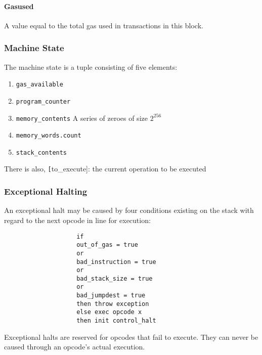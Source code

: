 \documentclass[10pt,a4paper,leqno,bibliography=totoc]{scrartcl}
\newenvironment{alphafootnotes}
{\par\edef\savedfootnotenumber{\number\value{footnote}}
\renewcommand{\thefootnote}{\alph{footnote}}
\setcounter{footnote}{0}}
{\par\setcounter{footnote}{\savedfootnotenumber}}
\begin{document}
\begin{alphafootnotes}
\begin{multicols*}{2}
				
				\paragraph{Gasused}
				A value equal to the total gas used in transactions in this block. 

				\subsubsection{Machine State}
				The machine state is a tuple consisting of five elements:
		
		\begin{enumerate}
			\item \texttt{gas\_available}
			\item \texttt{program\_counter}
			\item \texttt{memory\_contents} A series of zeroes of size $2^{256}$
			\item \texttt{memory\_words.count}
			\item \texttt{stack\_contents}
		\end{enumerate}

		There is also, \texttt[to\_execute]: the current operation to be executed
		
				\subsubsection{Exceptional Halting}
				An exceptional halt may be caused by four conditions existing on the stack with regard to the next opcode in line for execution:
		
					\begin{verbatim}
					if 
					out_of_gas = true 
					or
					bad_instruction = true
					or
					bad_stack_size = true
					or
					bad_jumpdest = true
					then throw exception
					else exec opcode x
					then init control_halt
					\end{verbatim}	
		
		Exceptional halts are reserved for opcodes that fail to execute. They can never be caused through an opcode's actual execution.
		

\end{multicols*}
\end{alphafootnotes}
\end{document}
